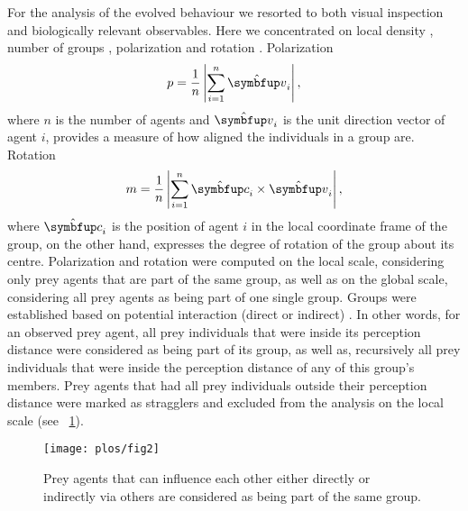 For the analysis of the evolved behaviour we resorted to both visual inspection \cite{kunz2006prey} and biologically relevant observables. Here we concentrated on local density \cite{huepe2008newtools}, number of groups \cite{lebarbajec2007boids,viscido2015using}, polarization and rotation \cite{couzin2002collective,tunstrom2013collective,vicsek2012collective}. Polarization
%
\begin{equation}
p=\frac{1}{n}\left|\sum_{i=1}^{n}\uvec{v}_i\right|,
\end{equation}
%
where $n$ is the number of agents and $\uvec{v}_i$ is the unit direction vector of agent $i$, provides a measure of how aligned the individuals in a group are. Rotation
%
\begin{equation}
m=\frac{1}{n}\left|\sum_{i=1}^{n}\uvec{c}_{i} \times \uvec{v}_i\right|,
\end{equation}
%
where $\uvec{c}_i$ is the position of agent $i$ in the local coordinate frame of the group, on the other hand, expresses the degree of rotation of the group about its centre. Polarization and rotation were computed on the local scale, \ie considering only prey agents that are part of the same group, as well as on the global scale, \ie considering all prey agents as being part of one single group. Groups were established based on potential interaction (direct or indirect) \cite{lebarbajec2007boids,viscido2015using}. In other words, for an observed prey agent, all prey individuals that were inside its perception distance were considered as being part of its group, as well as, recursively all prey individuals that were inside the perception distance of any of this group's members. Prey agents that had all prey individuals outside their perception distance were marked as stragglers and excluded from the analysis on the local scale (see \figurename~\ref{fig2}).

\begin{figure}
	\texttt{[image: plos/fig2]}
	\caption{Prey agents that can influence each other either directly or indirectly via others are considered as being part of the same group.}
	\label{fig2}
\end{figure}

